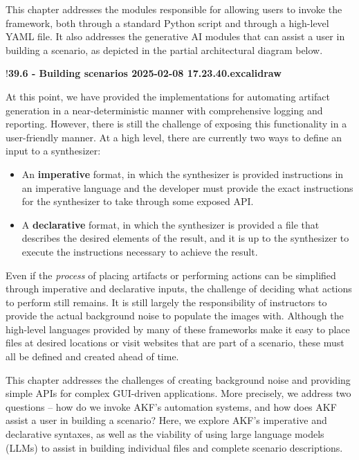\documentclass[letterpaper,12pt]{report}
\def\tightlist{}
\begin{document}
This chapter addresses the modules responsible for allowing users to
invoke the framework, both through a standard Python script and through
a high-level YAML file. It also addresses the generative AI modules that
can assist a user in building a scenario, as depicted in the partial
architectural diagram below.

!\textbf{39.6 - Building scenarios 2025-02-08 17.23.40.excalidraw}

At this point, we have provided the implementations for automating
artifact generation in a near-deterministic manner with comprehensive
logging and reporting. However, there is still the challenge of exposing
this functionality in a user-friendly manner. At a high level, there are
currently two ways to define an input to a synthesizer:

\begin{itemize}
\tightlist
\item
  An \textbf{imperative} format, in which the synthesizer is provided
  instructions in an imperative language and the developer must provide
  the exact instructions for the synthesizer to take through some
  exposed API.
\item
  A \textbf{declarative} format, in which the synthesizer is provided a
  file that describes the desired elements of the result, and it is up
  to the synthesizer to execute the instructions necessary to achieve
  the result.
\end{itemize}

Even if the \emph{process} of placing artifacts or performing actions
can be simplified through imperative and declarative inputs, the
challenge of deciding what actions to perform still remains. It is still
largely the responsibility of instructors to provide the actual
background noise to populate the images with. Although the high-level
languages provided by many of these frameworks make it easy to place
files at desired locations or visit websites that are part of a
scenario, these must all be defined and created ahead of time.

This chapter addresses the challenges of creating background noise and
providing simple APIs for complex GUI-driven applications. More
precisely, we address two questions -- how do we invoke AKF's automation
systems, and how does AKF assist a user in building a scenario? Here, we
explore AKF's imperative and declarative syntaxes, as well as the
viability of using large language models (LLMs) to assist in building
individual files and complete scenario descriptions.
\end{document}

